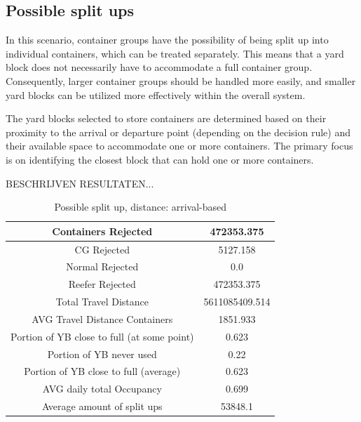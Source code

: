 \documentclass{article}
\begin{document}
\subsection{Possible split ups}

In this scenario, container groups have the possibility of being split up into
individual containers, which can be treated separately. This means that a yard
block does not necessarily have to accommodate a full container group.
Consequently, larger container groups should be handled more easily, and
smaller yard blocks can be utilized more effectively within the overall system.

The yard blocks selected to store containers are determined based on their
proximity to the arrival or departure point (depending on the decision rule)
and their available space to accommodate one or more containers. The primary
focus is on identifying the closest block that can hold one or more containers.

BESCHRIJVEN RESULTATEN...

\begin{table}[h]
    \centering
    \begin{tabular}{|c|c|}
        \hline
        Containers Rejected                         & 472353.375     \\ \hline
        CG Rejected                                 & 5127.158       \\ \hline
        Normal Rejected                             & 0.0            \\ \hline
        Reefer Rejected                             & 472353.375     \\ \hline
        Total Travel Distance                       & 5611085409.514 \\ \hline
        AVG Travel Distance Containers              & 1851.933       \\ \hline
        Portion of YB close to full (at some point) & 0.623          \\ \hline
        Portion of YB never used                    & 0.22           \\ \hline
        Portion of YB close to full (average)       & 0.623          \\ \hline
        AVG daily total Occupancy                   & 0.699          \\ \hline
        Average amount of split ups                 & 53848.1        \\ \hline
    \end{tabular}
    \caption{Possible split up, distance: arrival-based}
\end{table}
\end{document}
